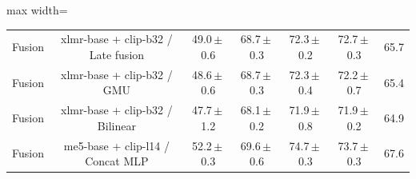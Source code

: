 \begin{table}[t]
\begin{adjustbox}{max width=\textwidth}
\begin{tabular}{lcccccc}
Fusion & xlmr-base + clip-b32 / Late fusion & 49.0\,$\pm$\,0.6 & 68.7\,$\pm$\,0.3 & 72.3\,$\pm$\,0.2 & 72.7\,$\pm$\,0.3 & 65.7 \\
Fusion & xlmr-base + clip-b32 / GMU & 48.6\,$\pm$\,0.6 & 68.7\,$\pm$\,0.3 & 72.3\,$\pm$\,0.4 & 72.2\,$\pm$\,0.7 & 65.4 \\
Fusion & xlmr-base + clip-b32 / Bilinear & 47.7\,$\pm$\,1.2 & 68.1\,$\pm$\,0.2 & 71.9\,$\pm$\,0.8 & 71.9\,$\pm$\,0.2 & 64.9 \\
Fusion & me5-base + clip-l14 / Concat MLP & 52.2\,$\pm$\,0.3 & 69.6\,$\pm$\,0.6 & 74.7\,$\pm$\,0.3 & 73.7\,$\pm$\,0.3 & 67.6 \\
\bottomrule
\end{tabular}
\end{adjustbox}
\end{table}
